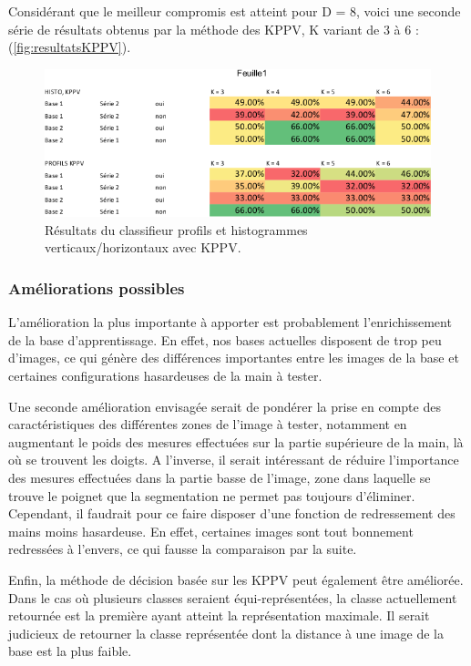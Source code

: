 Considérant que le meilleur compromis est atteint pour D = 8, voici une seconde série de résultats obtenus par la méthode des KPPV, K variant de 3 à 6 : (\autoref{fig:resultatsKPPV}).

\begin{figure}[htb!]
\centerline{\includegraphics[scale=0.7]{table1.png}}
\caption{Résultats du classifieur profils et histogrammes verticaux/horizontaux avec KPPV.}
\label{fig:resultatsKPPV}
\end{figure}

\subsubsection{Améliorations possibles}
L'amélioration la plus importante à apporter est probablement l'enrichissement de la base d'apprentissage. En effet, nos bases actuelles disposent de trop peu d'images, ce qui génère des différences importantes entre les images de la base et certaines configurations hasardeuses de la main à tester.

	Une seconde amélioration envisagée serait de pondérer la prise en compte des caractéristiques des différentes zones de l'image à tester, notamment en augmentant le poids des mesures effectuées sur la partie supérieure de la main, là où se trouvent les doigts. A l'inverse, il serait intéressant de réduire l'importance des mesures effectuées dans la partie basse de l'image, zone dans laquelle se trouve le poignet que la segmentation ne permet pas toujours d'éliminer. Cependant, il faudrait pour ce faire disposer d'une fonction de redressement des mains moins hasardeuse. En effet, certaines images sont tout bonnement redressées à l'envers, ce qui fausse la comparaison par la suite.

	Enfin, la méthode de décision basée sur les KPPV peut également être améliorée. Dans le cas où plusieurs classes seraient équi-représentées, la classe actuellement retournée est la première ayant atteint la représentation maximale. Il serait judicieux de retourner la classe représentée dont la distance à une image de la base est la plus faible.

